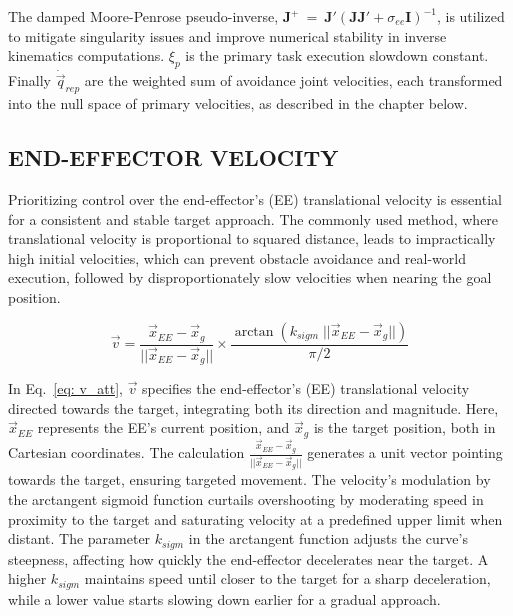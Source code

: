 \documentclass[letterpaper, 10 pt, conference]{ieeeconf}  %
\begin{document}
The damped Moore-Penrose pseudo-inverse, \(\mathbf{J}^+~=~\mathbf{J}'(\mathbf{J}\mathbf{J}' + \sigma_{ee} \mathbf{I})^{-1}\), is utilized to mitigate singularity issues and improve numerical stability in inverse kinematics computations. $\xi_{p}$ is the primary task execution slowdown constant. Finally $\dot{\vec{q}}_{rep}$ are the weighted sum of avoidance joint velocities, each transformed into the null space of primary velocities, as described in the chapter below. 


\subsection{END-EFFECTOR VELOCITY}

Prioritizing control over the end-effector's (EE) translational velocity is essential for a consistent and stable target approach. The commonly used method, where translational velocity is proportional to squared distance, leads to impractically high initial velocities, which can prevent obstacle avoidance and real-world execution, followed by disproportionately slow velocities when nearing the goal position. 


\begin{equation} 
	\vec{v} = \frac{\vec{x}_{EE} - \vec{x}_g}{||\vec{x}_{EE} - \vec{x}_g||} \times \frac{\arctan(k_{sigm} \; ||\vec{x}_{EE} - \vec{x}_g||) }{\pi/2}
	\label{eq: v_att}
\end{equation}

In Eq.~\ref{eq: v_att}, $\vec{v}$ specifies the end-effector's (EE) translational velocity directed towards the target, integrating both its direction and magnitude. Here, $\vec{x}_{EE}$ represents the EE's current position, and $\vec{x}_g$ is the target position, both in Cartesian coordinates. The calculation $\frac{\vec{x}_{EE}-\vec{x}_g}{||\vec{x}_{EE}-\vec{x}_g||}$ generates a unit vector pointing towards the target, ensuring targeted movement. The velocity's modulation by the arctangent sigmoid function curtails overshooting by moderating speed in proximity to the target and saturating velocity at a predefined upper limit when distant. The parameter \(k_{sigm}\) in the arctangent function adjusts the curve's steepness, affecting how quickly the end-effector decelerates near the target. A higher \(k_{sigm}\) maintains speed until closer to the target for a sharp deceleration, while a lower value starts slowing down earlier for a gradual approach. 
\end{document}
